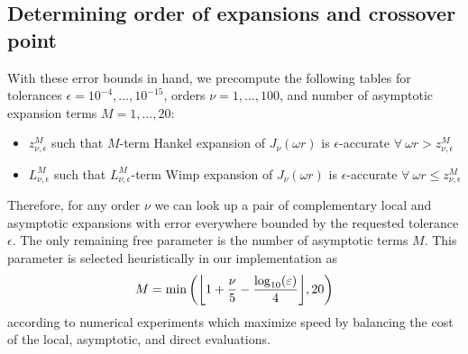 \subsection{Determining order of expansions and crossover point}
\label{sec:cutoff}

With these error bounds in hand, we precompute the following tables for
tolerances $\epsilon = 10^{-4}, \dots, \allowbreak 10^{-15}$, orders $\nu = 1,
\dots, 100$, and number of asymptotic expansion terms $M = 1, \dots, 20$:
\begin{itemize}
    \item $z_{\nu, \epsilon}^M$ such that $M$-term Hankel expansion of
    $J_\nu(\omega r)$ is $\epsilon$-accurate $\forall \ \omega r > z_{\nu,
    \epsilon}^M$
    \item $L_{\nu, \epsilon}^M$ such that $L_{\nu, \epsilon}^M$-term Wimp
    expansion of $J_\nu(\omega r)$ is $\epsilon$-accurate $\forall \ \omega r
    \leq z_{\nu, \epsilon}^M$
\end{itemize}
Therefore, for any order $\nu$ we can look up a pair of complementary local and
asymptotic expansions with error everywhere bounded by the requested tolerance
$\epsilon$. The only remaining free parameter is the number of asymptotic terms
$M$. This parameter is selected heuristically in our implementation as 
\begin{align} \label{eq:num-asy-terms}
    M = \min\left(\flr{1 + \frac{\nu}{5} - \frac{\log_{10}(\epsilon)}{4}}, 20\right)
\end{align}
according to numerical experiments which maximize speed by balancing the cost of
the local, asymptotic, and direct evaluations.



